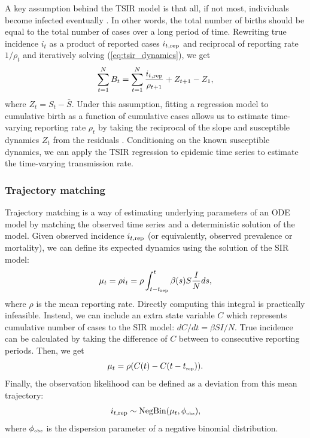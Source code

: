 \documentclass{article}
\newcommand{\eref}[1]{(\ref{eq:#1})}
\newcommand{\tsub}[2]{#1_{{\textrm{\tiny #2}}}}
\begin{document}
A key assumption behind the TSIR model is that all, if not most, individuals become infected eventually \citep{finkenstadt2000time}.
In other words, the total number of births should be equal to the total number of cases over a long period of time.
Rewriting true incidence $i_t$ as a product of reported cases $i_{t, {\tiny \textrm{rep}}}$ and reciprocal of reporting rate $1/\rho_t$ and iteratively solving \eref{tsir_dynamics}, we get
\begin{equation}
\sum_{t=1}^N B_t = \sum_{t=1}^N \frac{i_{t, {\tiny \textrm{rep}}}}{\rho_{t+1}} + Z_{t+1} - Z_1,
\end{equation}
where $Z_t = S_t - \bar{S}$.
Under this assumption, fitting a regression model to cumulative birth as a function of cumulative cases allows us to estimate time-varying reporting rate $\rho_t$ by taking the reciprocal of the slope and susceptible dynamics $Z_t$ from the residuals \citep{finkenstadt2000time}.
Conditioning on the known susceptible dynamics, we can apply the TSIR regression \label{eq:tsir} to epidemic time series to estimate the time-varying transmission rate.

\subsubsection*{Trajectory matching}

Trajectory matching is a way of estimating underlying parameters of an ODE model by matching the observed time series and a deterministic solution of the model.
Given observed incidence $i_{t, {\tiny \textrm{rep}}}$ (or equivalently, observed prevalence or mortality), we can define its expected dynamics using the solution of the SIR model:
\begin{equation}
\mu_t = \rho i_t = \rho \int_{t-\tsub{t}{rep}}^{t} \beta(s) S \frac{I}{N} ds,
\end{equation}
where $\rho$ is the mean reporting rate.
Directly computing this integral is practically infeasible. 
Instead, we can include an extra state variable $C$ which represents cumulative number of cases to the SIR model: $dC/dt = \beta SI/N$.
True incidence can be calculated by taking the difference of $C$ between to consecutive reporting periods.
Then, we get
\begin{equation}
\mu_t = \rho (C(t) - C(t-\tsub{t}{rep})).
\end{equation}
Finally, the observation likelihood can be defined as a deviation from this mean trajectory:
\begin{equation}
i_{t, {\tiny \textrm{rep}}} \sim \mathrm{NegBin}(\mu_t, \tsub{\phi}{obs}),
\end{equation}
where $\tsub{\phi}{obs}$ is the dispersion parameter of a negative binomial distribution.
\end{document}
